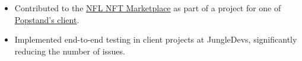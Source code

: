 \begin{itemize}
  \item Contributed to the \href{https://nflallday.com/marketplace/moments}{NFL NFT Marketplace} as part of a project for one of \href{https://finance.yahoo.com/news/nft-genius-marks-milestone-partnership-170500658.html?}{Popstand's client}.
  \item Implemented end-to-end testing in client projects at JungleDevs, significantly reducing the number of issues.
\end{itemize}
